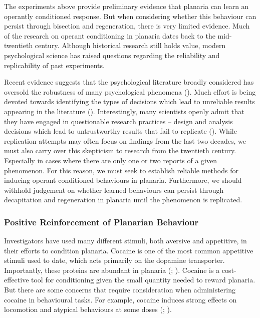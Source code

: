 \documentclass[
  jou,
  floatsintext,
  longtable,
  nolmodern,
  notxfonts,
  notimes,
  donotrepeattitle,
  colorlinks=true,linkcolor=blue,citecolor=blue,urlcolor=blue]{apa7}
\begin{document}
The experiments above provide preliminary evidence that planaria can
learn an operantly conditioned response. But when considering whether
this behaviour can persist through bisection and regeneration, there is
very limited evidence. Much of the research on operant conditioning in
planaria dates back to the mid-twentieth century. Although historical
research still holds value, modern psychological science has raised
questions regarding the reliability and replicability of past
experiments.

Recent evidence suggests that the psychological literature broadly
considered has oversold the robustness of many psychological phenomena
(). Much effort is being devoted towards identifying
the types of decisions which lead to unreliable results appearing in the
literature (). Interestingly, many scientists openly admit that they have
engaged in questionable research practices -- design and analysis
decisions which lead to untrustworthy results that fail to replicate
(). While replication attempts may often focus on findings from the
last two decades, we must also carry over this skepticism to research
from the twentieth century. Especially in cases where there are only one
or two reports of a given phenomenon. For this reason, we must seek to
establish reliable methods for inducing operant conditioned behaviours
in planaria. Furthermore, we should withhold judgement on whether
learned behaviours can persist through decapitation and regeneration in
planaria until the phenomenon is replicated.

\subsubsection{Positive Reinforcement of Planarian
Behaviour}\label{positive-reinforcement-of-planarian-behaviour}

Investigators have used many different stimuli, both aversive and
appetitive, in their efforts to condition planaria. Cocaine is one of
the most common appetitive stimuli used to date, which acts primarily on
the dopamine transporter. Importantly, these proteins are abundant in
planaria (;
). Cocaine is a cost-effective tool for conditioning given the
small quantity needed to reward planaria. But there are some concerns
that require consideration when administering cocaine in behavioural
tasks. For example, cocaine induces strong effects on locomotion and
atypical behaviours at some doses
(;
).
\end{document}
